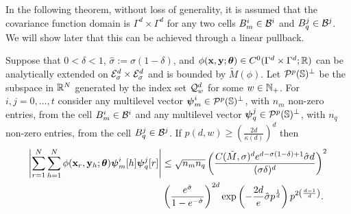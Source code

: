 \documentclass[11pt,final]{amsart}       %
\begin{document}
In the following theorem, without loss of generality, it is assumed
that the covariance function domain is $\Gamma^{d} \times \Gamma^{d}$
for any two cells $B^{i}_{m} \in {\mathcal B}^{i}$ and $B^{j}_{q} \in
{\mathcal B}^{j}$. We will show later that this can be achieved through a
linear pullback.

\begin{theorem} Suppose that $0< \delta < 1$, $\hat
  \sigma := \sigma (1 - \delta)$, and $\phi(\mathbf{x},\mathbf{y};\boldsymbol{\theta}) \in
  C^{0}(\Gamma^{d} \times \Gamma^{d};\Bbb{R})$ can be analytically extended
  on ${\mathcal E}^{d}_{\sigma} \times {\mathcal E}^{d}_{\sigma}$ and is bounded by
  $\tilde M(\phi)$. Let ${\mathcal P}^{ p}(\mathbb{S})^{\perp}$ be the
  subspace in $\Bbb{R}^{N}$ generated by the index set ${\mathcal Q}^{d}_{w}$ for
  some $w \in \mathbb{N}_{+}$. For $i,j = 0,\dots,t$ consider any
  multilevel vector $\boldsymbol{\psi}^{i}_m \in {\mathcal P}^{p}(\mathbb{S})^{\perp}$,
  with $n_m$ non-zero entries, from the cell $B^{i}_{m} \in {\mathcal B}^{i}$
  and any multilevel vector $\boldsymbol{\psi}^{j}_{q} \in {\mathcal P}^{
    p}(\mathbb{S})^{\perp}$, with $n_q$ non-zero entries, from the
  cell $B^{j}_{q} \in {\mathcal B}^{j}$. If $p(d,w) \geq \left(\frac{2
    d}{\kappa(d)}\right)^{d}$ then
\[
\begin{split}
\left|
\sum_{r = 1}^{N} 
\sum_{h = 1}^{N} 
\phi(\mathbf{x}_r,\mathbf{y}_h; \boldsymbol{\theta}) 
\boldsymbol{\psi}^i_m[h] \boldsymbol{\psi}^j_q[r] 
\right|
&\leq
\sqrt{n_mn_q}
\left( \frac{
  C(\tilde M,\sigma)^{d} e^{d - \sigma(1 - \delta) + 1} \hat \sigma d
}
 {
   (\sigma \delta)^{d}} \right)^2
 \\
 &
 \left( \frac{e^{\hat \sigma}}{1 - e^{-\hat \sigma}} \right)^{2d}
 \exp \left(-\frac{2d}{e} \hat \sigma  p^{\frac{1}{d}}
 \right) p^{2\left(\frac{d-1}{d}\right)}.
\end{split}
\]
\label{errorestimates:theorem1}
\end{theorem}
\end{document}
